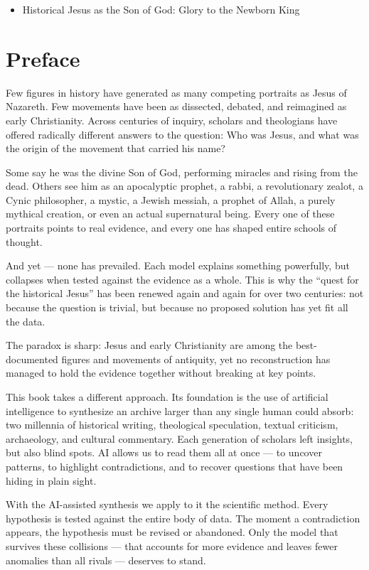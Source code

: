 \begin{itemize}
\item
  Historical Jesus as the Son of God: Glory to the Newborn King
\end{itemize}

\section{Preface}\label{par:preface}

Few figures in history have generated as many competing portraits as Jesus of Nazareth.
Few movements have been as dissected, debated, and reimagined as early Christianity.
Across centuries of inquiry, scholars and theologians have offered radically different answers to the question: Who was Jesus, and what was the origin of the movement that carried his name?

Some say he was the divine Son of God, performing miracles and rising from the dead.
Others see him as an apocalyptic prophet, a rabbi, a revolutionary zealot, a Cynic philosopher, a mystic, a Jewish messiah, a prophet of Allah, a purely mythical creation, or even an actual supernatural being.
Every one of these portraits points to real evidence, and every one has shaped entire schools of thought.

And yet — none has prevailed.
Each model explains something powerfully, but collapses when tested against the evidence as a whole.
This is why the “quest for the historical Jesus” has been renewed again and again for over two centuries: not because the question is trivial, but because no proposed solution has yet fit all the data.

The paradox is sharp: Jesus and early Christianity are among the best-documented figures and movements of antiquity, yet no reconstruction has managed to hold the evidence together without breaking at key points.

This book takes a different approach.
Its foundation is the use of artificial intelligence to synthesize an archive larger than any single human could absorb: two millennia of historical writing, theological speculation, textual criticism, archaeology, and cultural commentary.
Each generation of scholars left insights, but also blind spots.
AI allows us to read them all at once — to uncover patterns, to highlight contradictions, and to recover questions that have been hiding in plain sight.

With the AI-assisted synthesis we apply to it the scientific method.
Every hypothesis is tested against the entire body of data.
The moment a contradiction appears, the hypothesis must be revised or abandoned.
Only the model that survives these collisions — that accounts for more evidence and leaves fewer anomalies than all rivals — deserves to stand.

